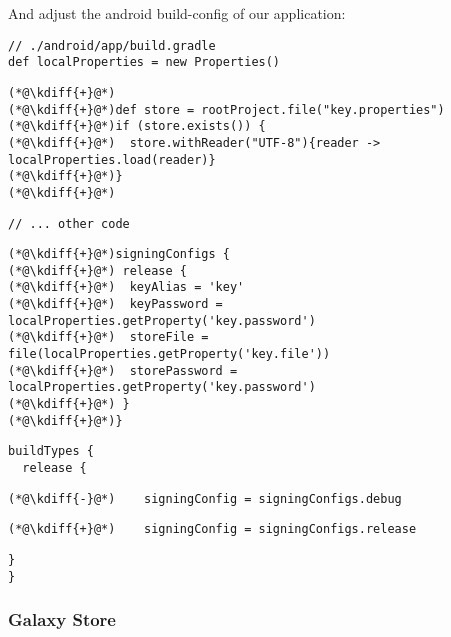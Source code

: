 \noindent And adjust the android build-config of our application:\\

{
\xpretocmd{\lstlisting}{\vspace{-12pt}}{}{}
\begin{lstlisting}
// ./android/app/build.gradle
def localProperties = new Properties()
\end{lstlisting}
\begin{lstlisting}[firstnumber=3, backgroundcolor=\color{backgreen}]
(*@\kdiff{+}@*)
(*@\kdiff{+}@*)def store = rootProject.file("key.properties")
(*@\kdiff{+}@*)if (store.exists()) {
(*@\kdiff{+}@*)  store.withReader("UTF-8"){reader -> localProperties.load(reader)}
(*@\kdiff{+}@*)}
(*@\kdiff{+}@*)
\end{lstlisting}
\begin{lstlisting}[firstnumber=9]
// ... other code
\end{lstlisting}
\begin{lstlisting}[firstnumber=63, backgroundcolor=\color{backgreen}]
(*@\kdiff{+}@*)signingConfigs {
(*@\kdiff{+}@*) release {
(*@\kdiff{+}@*)  keyAlias = 'key'
(*@\kdiff{+}@*)  keyPassword = localProperties.getProperty('key.password')
(*@\kdiff{+}@*)  storeFile = file(localProperties.getProperty('key.file'))
(*@\kdiff{+}@*)  storePassword = localProperties.getProperty('key.password')
(*@\kdiff{+}@*) }
(*@\kdiff{+}@*)}
\end{lstlisting}
\begin{lstlisting}[firstnumber=71]
buildTypes {
  release {
\end{lstlisting}
\begin{lstlisting}[firstnumber=73, backgroundcolor=\color{backred}]
(*@\kdiff{-}@*)    signingConfig = signingConfigs.debug
\end{lstlisting}
\begin{lstlisting}[firstnumber=73, backgroundcolor=\color{backgreen}]
(*@\kdiff{+}@*)    signingConfig = signingConfigs.release
\end{lstlisting}
\begin{lstlisting}[firstnumber=74]
  }
}
\end{lstlisting}
}


\subsubsection{Galaxy Store}

